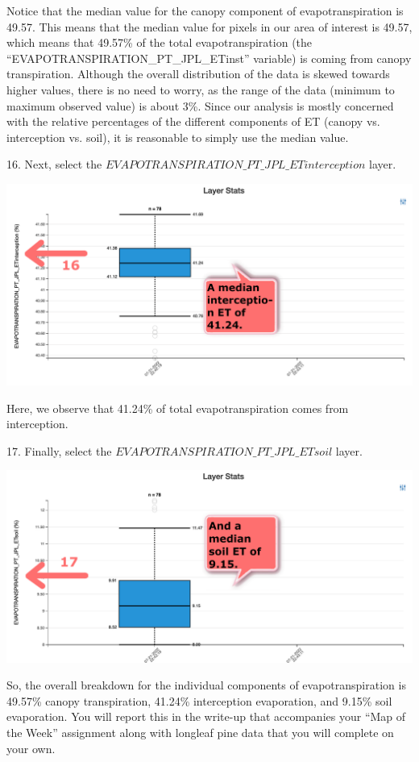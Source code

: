 \documentclass[oneside,a4paper,11pt,explicit]{book}
\begin{document}
\vspace{.5em}

Notice that the median value for the canopy component of evapotranspiration is 49.57. This means that the median value for pixels in our area of interest is 49.57, which means that 49.57\% of the total evapotranspiration (the ``EVAPOTRANSPIRATION\_PT\_JPL\_ETinst'' variable) is coming from canopy transpiration. Although the overall distribution of the data is skewed towards higher values, there is no need to worry, as the range of the data (minimum to maximum observed value) is about 3\%. Since our analysis is mostly concerned with the relative percentages of the different components of ET (canopy vs. interception vs. soil), it is reasonable to simply use the median value.

16. Next, select the $EVAPOTRANSPIRATION\_PT\_JPL\_ETinterception$ layer. 

\vspace{.5em}

\centerline{\includegraphics[width=.6\textwidth]{ETComponents2.png}}

\vspace{.5em}

Here, we observe that 41.24\% of total evapotranspiration comes from interception.

17. Finally, select the $EVAPOTRANSPIRATION\_PT\_JPL\_ETsoil$ layer.

\vspace{.5em}

\centerline{\includegraphics[width=.6\textwidth]{ETComponents3.png}}

\vspace{.5em}

So, the overall breakdown for the individual components of evapotranspiration is 49.57\% canopy transpiration, 41.24\% interception evaporation, and 9.15\% soil evaporation. You will report this in the write-up that accompanies your ``Map of the Week'' assignment along with longleaf pine data that you will complete on your own. 
\end{document}
